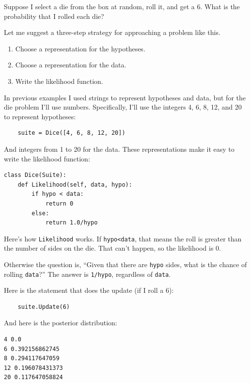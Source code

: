 \documentclass[12pt]{book}
\begin{document}
Suppose I select a die from the box at random, roll it, and get a 6.
What is the probability that I rolled each die?

Let me suggest a three-step strategy for approaching a problem like this.

\begin{enumerate}

\item Choose a representation for the hypotheses.

\item Choose a representation for the data.

\item Write the likelihood function.

\end{enumerate}

In previous examples I used strings to represent hypotheses and
data, but for the die problem I'll use numbers.  Specifically,
I'll use the integers 4, 6, 8, 12, and 20 to represent hypotheses:

\begin{verbatim}
    suite = Dice([4, 6, 8, 12, 20])
\end{verbatim}

And integers from 1 to 20 for the data.
These representations make it easy to
write the likelihood function:

\begin{verbatim}
class Dice(Suite):
    def Likelihood(self, data, hypo):
        if hypo < data:
            return 0
        else:
            return 1.0/hypo
\end{verbatim}

Here's how \verb"Likelihood" works.  If \verb"hypo<data", that
means the roll is greater than the number of sides on the die.
That can't happen, so the likelihood is 0.

Otherwise the question is, ``Given that there are {\tt hypo}
sides, what is the chance of rolling {\tt data}?''  The
answer is \verb"1/hypo", regardless of {\tt data}.

Here is the statement that does the update (if I roll a 6):

\begin{verbatim}
    suite.Update(6)
\end{verbatim}

And here is the posterior distribution:

\begin{verbatim}
4 0.0
6 0.392156862745
8 0.294117647059
12 0.196078431373
20 0.117647058824
\end{verbatim}
\end{document}
